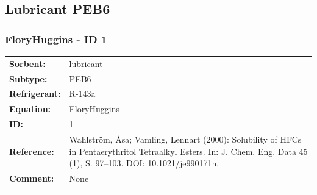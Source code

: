 \subsection{Lubricant PEB6}
%
\subsubsection{FloryHuggins - ID 1}
%
\begin{tabular}[l]{|lp{11.5cm}|}
\hline
\addlinespace

\textbf{Sorbent:} & lubricant \\
\textbf{Subtype:} & PEB6 \\
\textbf{Refrigerant:} & R-143a \\
\textbf{Equation:} & FloryHuggins \\
\textbf{ID:} & 1 \\
\textbf{Reference:} & Wahlström, Åsa; Vamling, Lennart (2000): Solubility of HFCs in Pentaerythritol Tetraalkyl Esters. In: J. Chem. Eng. Data 45 (1), S. 97–103. DOI: 10.1021/je990171n. \\
\textbf{Comment:} & None \\

\addlinespace
\hline
\end{tabular}
\newline

